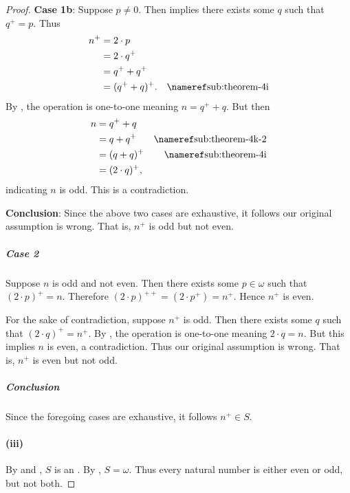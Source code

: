 \documentclass{report}
\begin{document}
\begin{proof}
        \vspace{8pt}\quad
        \textbf{Case 1b}: Suppose $p \neq 0$.
        Then  implies there exists some $q$ such that
          $q^+ = p$.
        Thus
          \begin{align*}
            n^+
              & = 2 \cdot p \\
              & = 2 \cdot q^+ \\
              & = q^+ + q^+ \\
              & = (q^+ + q)^+. & \textref{sub:theorem-4i}
          \end{align*}
        By , the  operation is
          one-to-one meaning $n = q^+ + q$.
        But then
          \begin{align*}
            n
              & = q^+ + q \\
              & = q + q^+ & \textref{sub:theorem-4k-2} \\
              & = (q + q)^+ & \textref{sub:theorem-4i} \\
              & = (2 \cdot q)^+,
          \end{align*}
          indicating $n$ is odd.
        This is a contradiction.

        \vspace{8pt}\quad
        \textbf{Conclusion}: Since the above two cases are exhaustive, it
          follows our original assumption is wrong.
        That is, $n^+$ is odd but not even.

      \subparagraph{Case 2}%

        Suppose $n$ is odd and not even.
        Then there exists some $p \in \omega$ such that $(2 \cdot p)^+ = n$.
        Therefore $(2 \cdot p)^{++} = (2 \cdot p^+) = n^+$.
        Hence $n^+$ is even.

        For the sake of contradiction, suppose $n^+$ is odd.
        Then there exists some $q$ such that $(2 \cdot q)^+ = n^+$.
        By , the  operation is
          one-to-one meaning $2 \cdot q = n$.
        But this implies $n$ is even, a contradiction.
        Thus our original assumption is wrong.
        That is, $n^+$ is even but not odd.

      \subparagraph{Conclusion}%

        Since the foregoing cases are exhaustive, it follows $n^+ \in S$.

    \paragraph{(iii)}%

      By  and ,
        $S$ is an .
      By , $S = \omega$.
      Thus every natural number is either even or odd, but not both.

  \end{proof}
\end{document}
